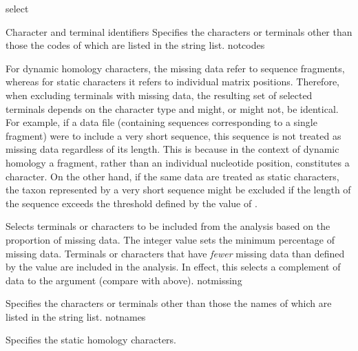 \begin{command}{select}{}
\begin{arguments}
\begin{argumentgroup}{Character and terminal identifiers}
                {Specifies the characters or terminals other than those the
                codes of which are listed in the string list.}
                {notcodes}
    
            \begin{statement}
                For dynamic homology characters, the missing data refer to
                sequence fragments, whereas for static characters it refers to
                individual matrix positions. Therefore, when excluding
                terminals with missing data, the resulting set of selected
                terminals depends on the character type and might, or
                might not, be identical. For example, if a data file (containing
                sequences corresponding to a single fragment) were to include
                a very short sequence, this sequence is not treated as
                missing data regardless of its length. This is because in the
                context of dynamic homology a fragment, rather than an
                individual nucleotide position, constitutes a character.
                On the other hand, if the same data are treated as static characters,
                the taxon represented by a very short sequence
                might be excluded if the length of the sequence exceeds the
                threshold defined by the value of .
            \end{statement}

                {Selects terminals or characters to be included from the analysis
                based on the proportion of missing data. The
                integer value sets the minimum percentage of missing
                data. Terminals or characters that have  \emph{fewer} missing data
                than defined by the value are included in the analysis.
                In effect, this selects a complement of data to the argument 
                (compare with  above).}
                {notmissing} 
        
                {Specifies the characters or terminals other than those the
                names of which are listed in the string list.}
                {notnames}

           
                {Specifies the static homology characters.}
                {}


\end{argumentgroup}
\end{arguments}
\end{command}
